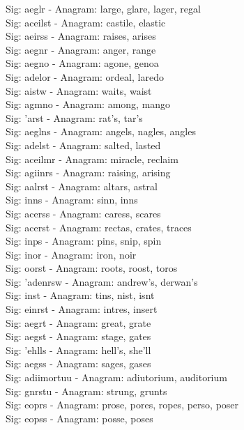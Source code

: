 Sig: {aeglr} - Anagram: large, glare, lager, regal \\
Sig: {aceilst} - Anagram: castile, elastic \\
Sig: {aeirss} - Anagram: raises, arises \\
Sig: {aegnr} - Anagram: anger, range \\
Sig: {aegno} - Anagram: agone, genoa \\
Sig: {adelor} - Anagram: ordeal, laredo \\
Sig: {aistw} - Anagram: waits, waist \\
Sig: {agmno} - Anagram: among, mango \\
Sig: {'arst} - Anagram: rat's, tar's \\
Sig: {aeglns} - Anagram: angels, nagles, angles \\
Sig: {adelst} - Anagram: salted, lasted \\
Sig: {aceilmr} - Anagram: miracle, reclaim \\
Sig: {agiinrs} - Anagram: raising, arising \\
Sig: {aalrst} - Anagram: altars, astral \\
Sig: {inns} - Anagram: sinn, inns \\
Sig: {acerss} - Anagram: caress, scares \\
Sig: {acerst} - Anagram: rectas, crates, traces \\
Sig: {inps} - Anagram: pins, snip, spin \\
Sig: {inor} - Anagram: iron, noir \\
Sig: {oorst} - Anagram: roots, roost, toros \\
Sig: {'adenrsw} - Anagram: andrew's, derwan's \\
Sig: {inst} - Anagram: tins, nist, isnt \\
Sig: {einrst} - Anagram: intres, insert \\
Sig: {aegrt} - Anagram: great, grate \\
Sig: {aegst} - Anagram: stage, gates \\
Sig: {'ehlls} - Anagram: hell's, she'll \\
Sig: {aegss} - Anagram: sages, gases \\
Sig: {adiimortuu} - Anagram: adiutorium, auditorium \\
Sig: {gnrstu} - Anagram: strung, grunts \\
Sig: {eoprs} - Anagram: prose, pores, ropes, perso, poser \\
Sig: {eopss} - Anagram: posse, poses \\
